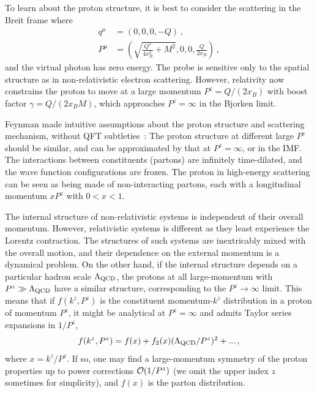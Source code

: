 \documentclass[aps,rmp,reprint,amsmath,amssymb,graphicx,longbibliography]{revtex4-1} %
\begin{document}
To learn about the proton structure, it is best to consider
the scattering in the Breit frame where
\begin{align}\label{eq:diskin}
	q^\mu &= (0,0,0,-Q)  \,, \nonumber \\
	P^\mu &=\left(\sqrt{\frac{Q^2}{4x_B^2}+M^2}, 0, 0, \frac{Q}{2x_B}\right) \,,
\end{align}
and the virtual photon has zero energy. The probe is sensitive only to
the spatial structure as in non-relativistic electron scattering.
However, relativity now constrains the proton to move at a large
momentum $P^z= Q/(2x_B)$ with boost factor $\gamma = Q/(2x_BM)$,
which approaches $P^z=\infty$ in the Bjorken limit.

Feynman made intuitive assumptions about
the proton structure and scattering mechanism, without QFT subtleties~\cite{Feynman:1973xc}:
The proton structure at different large $P^z$ should be similar, and can be
approximated by that at $P^z=\infty$, or in the IMF. The interactions between
constituents (partons) are infinitely time-dilated, and
the wave function configurations are frozen. The proton in high-energy scattering
can be seen as being made of non-interacting partons, each with a longitudinal
momentum $xP^z$ with $0< x< 1$.

The internal structure of non-relativistic
systems is independent of their overall momentum. However, relativistic systems
is different as they least experience the Lorentz contraction.
The structures of such systems are inextricably mixed with
the overall motion, and their dependence on the external momentum is a
dynamical problem. On the other hand, if the internal structure
depends on a particular hadron scale $\Lambda_{\rm QCD}$, the protons at all large-momentum
with $P^z\gg \Lambda_{\rm QCD}$ have a similar structure, corresponding to the
$P^z\to \infty$ limit. This means that if $f(k^z,P^z)$
is the constituent momentum-$k^z$ distribution in a proton of momentum $P^z$,
it might be analytical at $P^z=\infty$ and admits Taylor series expansions
in $1/P^z$,
\begin{align}\label{Eq:expansion}
	f(k^z, P^z) = f(x) + f_2(x)(\Lambda_{\rm QCD}/P^z)^2 + ...\,,
\end{align}
where $x=k^z/P^z$. If so, one may find a large-momentum symmetry of
the proton properties up to power corrections ${\cal O}(1/P^z)$ (we omit the upper index $z$ sometimes
for simplicity), and $f(x)$ is the parton distribution.
\end{document}

